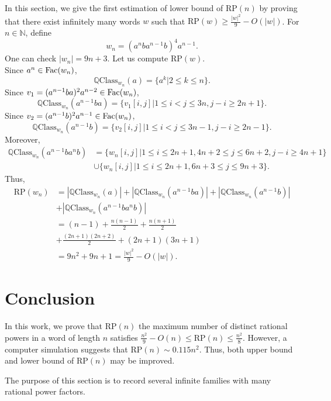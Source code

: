 \documentclass[runningheads,envcountsame,a4paper]{llncs}
\newcommand{\fac}{\hbox{\rm Fac}}
\newcommand{\N}{\mathbb N}
\newcommand{\qcl}{\mathbb{Q}\mathrm{Class}}
\newcommand{\rp}{\mathrm{RP}}
\begin{document}
In this section, we give the first estimation of lower bound of $\rp(n)$ by proving that there exist infinitely many words $w$ such that $\rp(w)\ge \frac{|w|^2}{9}-O(|w|)$. For $n \in \N$, define 
$$w_n=(a^nba^{n-1}b)^4a^{n-1}.$$
One can check $|w_n|=9n+3.$ Let us compute $\rp(w)$.\\
Since $a^n \in \fac(w_n)$, 
$$\qcl_{w_n}(a)=\{a^k|2 \le k \le n \}.$$
Since $v_1=(a^{n-1}ba)^2a^{n-2} \in \fac(w_n)$, 
$$\qcl_{w_n}(a^{n-1}ba)=\{v_1[i,j] |1 \le i <j \le 3n, j-i \geq 2n+1 \}.$$
Since $v_2=(a^{n-1}b)^2a^{n-1} \in \fac(w_n)$, 
$$\qcl_{w_n}(a^{n-1}b)=\{v_2[i,j] |1 \le i <j \le 3n-1, j-i \geq 2n-1 \}.$$
Moreover,
\begin{align*}
 \qcl_{w_n}(a^{n-1}ba^nb)
 &=
 \{w_n[i,j]|1\le i\le 2n+1,4n+2\le j\le 6n+2,j-i\ge 4n+1\} \\
 &\cup
 \{w_n[i,j]|1\le i\le 2n+1,6n+3\le j\le 9n+3\}.
\end{align*}
Thus, \begin{align*}
    \rp(w_n)&=|\qcl_{w_n}(a)|+|\qcl_{w_n}(a^{n-1}ba)|+|\qcl_{w_n}(a^{n-1}b)|\\
    &+|\qcl_{w_n}(a^{n-1}ba^nb)|\\
    &=(n-1)+\frac{n(n-1)}{2}+\frac{n(n+1)}{2}\\
    &+\frac{(2n+1)(2n+2)}{2}+(2n+1)(3n+1)\\
    &=9n^2+9n+1=\frac{|w|^2}{9}-O(|w|).
    \end{align*}

\section{Conclusion}
In this work, we prove that $\rp(n)$ the maximum number of distinct rational powers in a word of length $n$ satisfies $\frac{n^2}{9}-O(n) \le \rp(n) \le \frac{n^2}{8}$. However, a computer simulation suggests that $\rp(n) \sim 0.115n^2$. Thus, both upper bound and lower bound of $\rp(n)$ may be improved.

























\iffalse
The purpose of this section is
to record several infinite families with many rational power factors.
\end{document}
